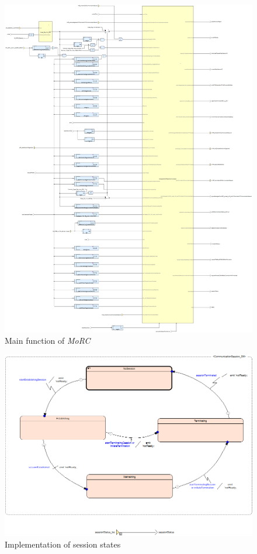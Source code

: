 \begin{figure}[hbtp]
\centering
\includegraphics[scale=0.2]{../images/MoRC_Main.png}
\caption{Main function of \textit{MoRC}}
\end{figure}

\begin{figure}[hbtp]
\centering
\includegraphics[scale=0.5]{../images/MoRC_SessionManagement.png}
\caption{Implementation of session states}
\end{figure}


